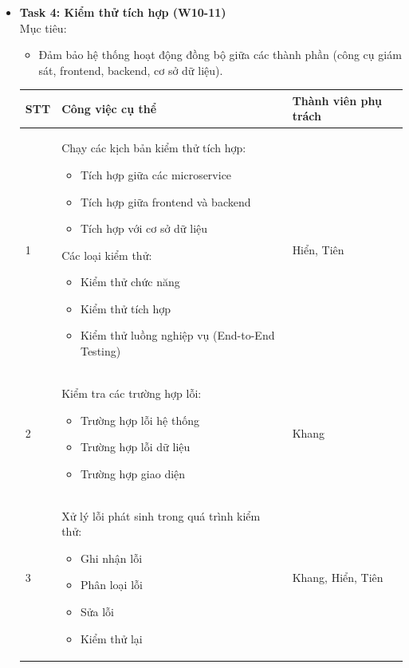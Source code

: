 \begin{itemize}
\item\textbf{Task 4: Kiểm thử tích hợp (W10-11)}\\
\indent Mục tiêu:
\begin{itemize}
    \item Đảm bảo hệ thống hoạt động đồng bộ giữa các thành phần (công cụ giám sát, frontend, backend, cơ sở dữ liệu).
\end{itemize}
\begin{table}[H]
    \centering
    \begin{tabular}{|p{1cm}|p{8cm}|p{4cm}|}
        \hline
        \textbf{STT} & \textbf{Công việc cụ thể} & \textbf{Thành viên phụ trách} \\
        \hline
        1 & 
        Chạy các kịch bản kiểm thử tích hợp:
        \begin{itemize}
            \item Tích hợp giữa các microservice
            \item Tích hợp giữa frontend và backend
            \item Tích hợp với cơ sở dữ liệu
        \end{itemize}
        Các loại kiểm thử:
        \begin{itemize}
            \item Kiểm thử chức năng
            \item Kiểm thử tích hợp
            \item Kiểm thử luồng nghiệp vụ (End-to-End Testing)
        \end{itemize} & Hiển, Tiên \\
        \hline
        2 & 
        Kiểm tra các trường hợp lỗi:
        \begin{itemize}
            \item Trường hợp lỗi hệ thống
            \item Trường hợp lỗi dữ liệu
            \item Trường hợp giao diện
        \end{itemize} & Khang \\
        \hline
        3 & 
        Xử lý lỗi phát sinh trong quá trình kiểm thử:
        \begin{itemize}
            \item Ghi nhận lỗi
            \item Phân loại lỗi
            \item Sửa lỗi
            \item Kiểm thử lại
        \end{itemize} & Khang, Hiển, Tiên \\
        \hline
    \end{tabular}
\end{table}


\end{itemize}
